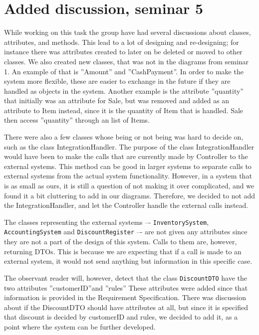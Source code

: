 \documentclass[a4paper]{scrreprt}
\begin{document}
\section*{Added discussion, seminar 5}
While working on this task the group have had several discussions about classes, attributes, and methods.
This lead to a lot of designing and re-designing; for instance there was attributes created to later on be deleted or moved to other classes.
We also created new classes, that was not in the diagrams from seminar 1.
An example of that is ''Amount'' and ''CashPayment''.
In order to make the system more flexible, these are easier to exchange in the future if they are handled as objects in the system.
Another example is the attribute ''quantity'' that initially was an attribute for Sale,
but was removed and added as an attribute to Item instead, since it is the quantity of Item that is handled.
Sale then access ''quantity'' through an list of Items.

There were also a few classes whose being or not being was hard to decide on, such as the class IntegrationHandler.
The purpose of the class IntegrationHandler would have been to make the calls that are currently made by
Controller to the external systems.
This method can be good in larger systems to separate calls to external systems from the actual system functionality.
However, in a system that is as small as ours, it is still a question of not making it over complicated,
and we found it a bit cluttering to add in our diagrams.
Therefore, we decided to not add the IntegrationHandler, and let the Controller handle the external calls instead.

The classes representing the external systems
–- \texttt{InventorySystem}, \texttt{AccountingSystem} and \texttt{DiscountRegister} –- are not
given any attributes since they are not a part of the design of this system.
Calls to them are, however, returning DTOs.
This is because we are expecting that if a call is made to an external system,
it would not send anything but information in this specific case.

The observant reader will, however, detect that the class \texttt{DiscountDTO} have the two attributes ''customerID''and ''rules''
These attributes were added since that information is provided in the Requirement Specification.
There was discussion about if the DiscountDTO should have attributes at all,
but since it is specified that discount is decided by customerID and rules, we decided to add it, as a point where the system can be further developed.
\end{document}
